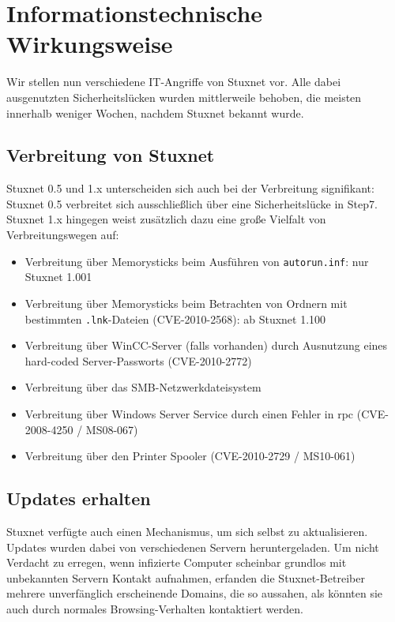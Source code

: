 \documentclass[a4paper]{article}
\begin{document}
\section{Informationstechnische Wirkungsweise}

Wir stellen nun verschiedene IT-Angriffe von Stuxnet vor.
Alle dabei ausgenutzten Sicherheitslücken wurden mittlerweile behoben, die meisten innerhalb weniger Wochen, nachdem Stuxnet bekannt wurde.

\subsection{Verbreitung von Stuxnet}

Stuxnet 0.5 und 1.x unterscheiden sich auch bei der Verbreitung signifikant:
Stuxnet 0.5 verbreitet sich ausschließlich über eine Sicherheitslücke in Step7.
Stuxnet 1.x hingegen weist zusätzlich dazu eine große Vielfalt von Verbreitungswegen auf:

\begin{itemize}
\item Verbreitung über Memorysticks beim Ausführen von \texttt{autorun.inf}: nur Stuxnet 1.001\cite{dossier} %
\item Verbreitung über Memorysticks beim Betrachten von Ordnern mit bestimmten \texttt{.lnk}-Dateien (CVE-2010-2568\cite{CVE_lnk}): ab Stuxnet 1.100
\item Verbreitung über WinCC-Server (falls vorhanden) durch Ausnutzung eines hard-coded Server-Passworts (CVE-2010-2772\cite{CVE_wincc})
\item Verbreitung über das SMB-Netzwerkdateisystem
\item Verbreitung über Windows Server Service durch einen Fehler in \gls{rpc} (CVE-2008-4250\cite{CVE_rpc} / MS08-067\cite{MS_rpc})
\item Verbreitung über den Printer Spooler (CVE-2010-2729\cite{CVE_spooler} / MS10-061\cite{MS_spooler})
\end{itemize} %

\subsection{Updates erhalten}

Stuxnet verfügte auch einen Mechanismus, um sich selbst zu aktualisieren.
Updates wurden dabei von verschiedenen Servern heruntergeladen.
Um nicht Verdacht zu erregen, wenn infizierte Computer scheinbar grundlos mit unbekannten Servern Kontakt aufnahmen,
erfanden die Stuxnet-Betreiber mehrere unverfänglich erscheinende Domains,
die so aussahen, als könnten sie auch durch normales Browsing-Verhalten kontaktiert werden.
\end{document}
